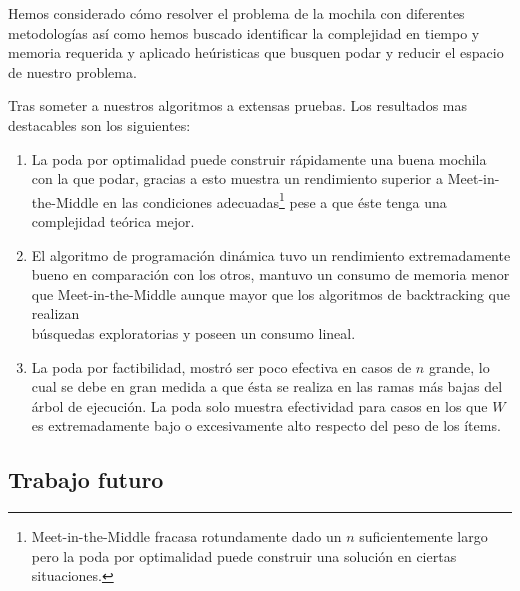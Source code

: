 \documentclass[fleqn, 11pt]{article}
\begin{document}
Hemos considerado cómo resolver el problema de la mochila con diferentes
metodologías así como hemos buscado identificar la complejidad en tiempo y
memoria requerida y aplicado heúristicas que busquen podar y reducir el espacio
de nuestro problema.

Tras someter a nuestros algoritmos a extensas pruebas. Los resultados mas
destacables son los siguientes:

\begin{enumerate}
	\item La poda por optimalidad puede construir rápidamente una buena
	mochila con la que podar, gracias a esto muestra un rendimiento
	superior a Meet-in-the-Middle en las condiciones
	adecuadas\footnote{Meet-in-the-Middle fracasa rotundamente dado un $n$
	suficientemente largo pero la poda por optimalidad puede construir una
	solución en ciertas situaciones.} pese a que éste tenga una complejidad
	teórica mejor.

	\item El algoritmo de programación dinámica tuvo un rendimiento
	extremadamente bueno en comparación con los otros, mantuvo un consumo
	de memoria menor que Meet-in-the-Middle aunque mayor que los algoritmos
	de backtracking que realizan\\búsquedas exploratorias y poseen un
	consumo lineal.
	
	\item La poda por factibilidad, mostró ser poco efectiva en casos de
	$n$ grande, lo cual se debe en gran medida a que ésta se realiza en las
	ramas más bajas del árbol de ejecución. La poda solo muestra
	efectividad para casos en los que $W$ es extremadamente bajo o
	excesivamente alto respecto del peso de los ítems.
\end{enumerate}

\subsection{Trabajo futuro}
\end{document}

